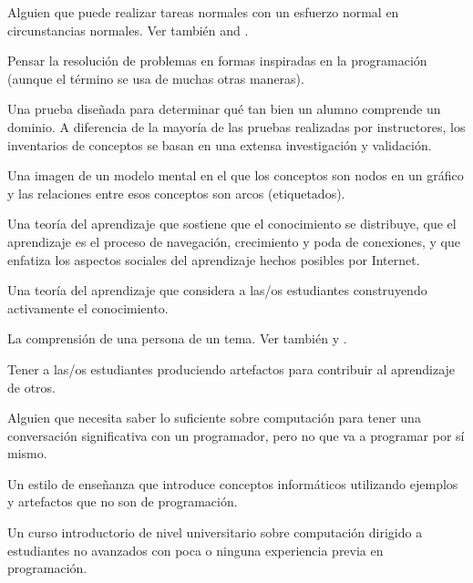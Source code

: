 \begin{description}
 Alguien que puede 
realizar tareas normales con un esfuerzo normal en circunstancias normales. Ver también
 and .

 Pensar la
resolución de problemas en formas inspiradas en la programación (aunque el término se usa de muchas
otras maneras).

 Una prueba diseñada para determinar 
qué tan bien un alumno comprende un dominio. A diferencia de la mayoría de las pruebas realizadas por instructores, 
los inventarios de conceptos se basan en una extensa investigación y validación.

 Una imagen de un modelo mental en el que 
los conceptos son nodos en un gráfico y las relaciones entre esos conceptos son arcos (etiquetados).

 Una teoría del aprendizaje que sostiene que el conocimiento se distribuye, 
que el aprendizaje es el proceso de navegación, crecimiento y poda de conexiones, y que enfatiza los aspectos 
sociales del aprendizaje hechos posibles por Internet.

 Una teoría del aprendizaje que considera a 
las/os estudiantes construyendo activamente el conocimiento.

 La comprensión de una 
persona de un tema. Ver también
y .

 Tener a las/os estudiantes
produciendo artefactos para contribuir al aprendizaje de otros.

 Alguien que necesita saber
lo suficiente sobre computación para tener una conversación significativa con un programador, 
pero no que va a programar por sí mismo.

 Un estilo de enseñanza que introduce 
conceptos informáticos utilizando ejemplos y artefactos que no son de programación.

 Un curso introductorio de nivel universitario sobre computación 
dirigido a estudiantes no avanzados con poca o ninguna experiencia previa en programación.


\end{description}
